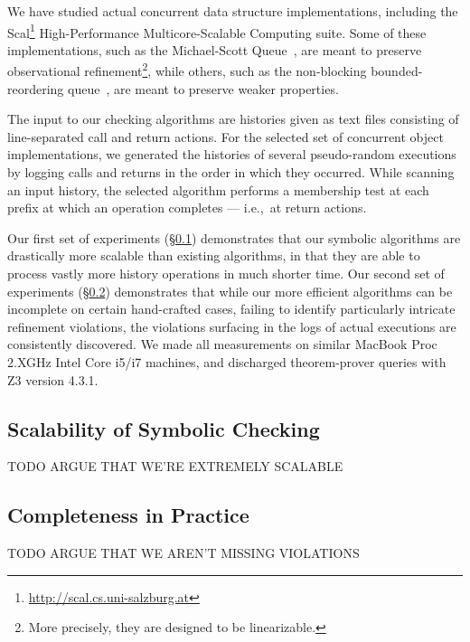 We have studied actual concurrent data structure implementations, including the
Scal\footnote{\url{http://scal.cs.uni-salzburg.at}} High-Performance
Multicore-Scalable Computing suite. Some of these implementations, such as the
Michael-Scott Queue~\cite{conf/podc/MichaelS96}, are meant to preserve
observational refinement\footnote{More precisely, they are designed to be
linearizable.}, while others, such as the non-blocking bounded-reordering
queue~\cite{conf/pact/KirschLP13}, are meant to preserve weaker properties.

The input to our checking algorithms are histories given as text files
consisting of line-separated call and return actions. For the selected set of
concurrent object implementations, we generated the histories of several
pseudo-random executions by logging calls and returns in the order in which
they occurred. While scanning an input history, the selected algorithm performs
a membership test at each prefix at which an operation completes --- i.e.,~at
return actions.

Our first set of experiments (\S\ref{sec:exp:scalable}) demonstrates that our
symbolic algorithms are drastically more scalable than existing algorithms, in
that they are able to process vastly more history operations in much shorter
time. Our second set of experiments (\S\ref{sec:exp:complete}) demonstrates
that while our more efficient algorithms can be incomplete on certain
hand-crafted cases, failing to identify particularly intricate refinement
violations, the violations surfacing in the logs of actual executions are
consistently discovered. We made all measurements on similar MacBook Proc
2.XGHz Intel Core i5/i7 machines, and discharged theorem-prover queries with
Z3 version 4.3.1.

\subsection{Scalability of Symbolic Checking}
\label{sec:exp:scalable}

TODO ARGUE THAT WE'RE EXTREMELY SCALABLE

\subsection{Completeness in Practice}
\label{sec:exp:complete}

TODO ARGUE THAT WE AREN'T MISSING VIOLATIONS


